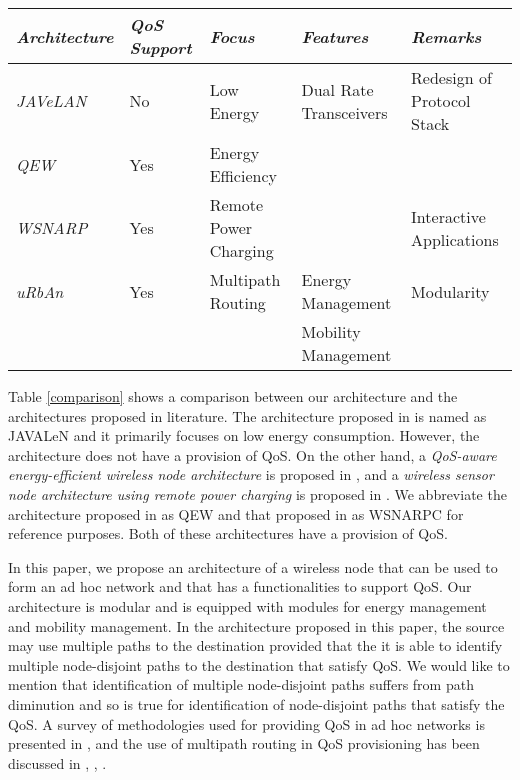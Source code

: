 \documentclass[10pt,times,epsfig,psfig,twocolumn,algorithm,algorithmic]{IEEEtran}
\begin{document}
\begin{table*}
\begin{center}
\caption{Comparison of different architectures and their featutes.}
\label{comparison}
\begin{tabular}{|l||l|l|l|l|}\hline
\em Architecture & \em QoS Support & \em Focus & \em Features & \em Remarks\\\hline \hline
\em JAVeLAN \cite{redi} & No & Low Energy & Dual Rate Transceivers & Redesign of Protocol Stack\\\hline
\em QEW \cite{lettieri} & Yes & Energy Efficiency & & \\\hline
\em WSNARP \cite{dsouza} & Yes & Remote Power Charging & & Interactive Applications\\\hline
\em uRbAn & Yes & Multipath Routing & Energy Management & Modularity\\
        &    &  & Mobility Management & \\\hline
\end{tabular}
\end{center}
\end{table*}



Table \ref{comparison} shows a comparison between our architecture and the architectures proposed in literature. The architecture proposed in \cite{redi} is named as JAVALeN and it primarily focuses on low energy consumption. However, the architecture does not have a provision of QoS. On the other hand, a {\em QoS-aware energy-efficient wireless node architecture} is proposed in \cite{lettieri}, and a {\em wireless sensor node architecture using remote power charging} is proposed in \cite{dsouza}.  We abbreviate the architecture proposed in \cite{lettieri} as QEW and that proposed in \cite{dsouza} as WSNARPC for reference purposes. Both of these architectures have a provision of QoS. 

In this paper, we propose an architecture of a wireless node that can be used to form an ad hoc network and that has a functionalities to support QoS. Our architecture is modular and is equipped with modules for energy management and mobility management. In the architecture proposed in this paper, the source may use multiple paths to the destination provided that the it is able to identify multiple node-disjoint paths to the destination that satisfy QoS. We would like to mention that identification of multiple node-disjoint paths suffers from path diminution \cite{abbas-jain} and so is true for identification of node-disjoint paths that satisfy the QoS. A survey of methodologies used for providing QoS in ad hoc networks is presented in \cite{abbas-survey}, and the use of multipath routing in QoS provisioning has been discussed in \cite{abbas-ngmast}, \cite{abbas-ndt}, \cite{abbas-jdim}.  
\end{document}
